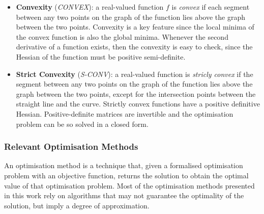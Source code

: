 \documentclass[sn-mathphys-num]{sn-jnl}%
\newcommand \sconv{\textit{S-CONV}}
\newcommand \conv{\textit{CONVEX}}
\renewcommand\vec{\mathbf}
\begin{document}
\begin{itemize}
    To understand the robustness of a model, such as a neural network, some research papers \cite{virmaux2018lipschitz,gouk2021regularisation} have tried to train the underlying model by defining an input-output map 
    with a small Lipschitz constant. The intuition is that if a model is robust, it should not be too affected by perturbations in the input, $f(x + \delta x) \approx f(x) $, and this would be ensured by having $f$ be $\ell$-Lipschitz where $\ell$ is small \cite{adversarial_robustness_lipschitz_bound}.
    \item \textbf{Convexity} (\conv): a real-valued function $f$ is \textit{convex} if each segment between any two points on the graph of the function lies above the graph between the two points.
    Convexity is a key feature since the local minima of the convex function is also the global minima. Whenever the second derivative of a function exists, then the convexity is easy to check, since the Hessian of the function must be positive semi-definite.
    \item \textbf{Strict Convexity} (\sconv): a real-valued function is \textit{stricly convex} if the segment between any two points on the graph of the function lies above the graph between the two points, except for the intersection points between the straight line and the curve. Strictly convex functions have a positive definitive Hessian.
    Positive-definite matrices are invertible and the optimisation problem can be so solved in a closed form.
\end{itemize}

\subsubsection{Relevant Optimisation Methods}
An optimisation method is a technique that, given a formalised optimisation problem with an objective function, returns the solution to obtain the optimal value of that optimisation problem. Most of the optimisation methods presented in this work rely on algorithms that may not guarantee the optimality of the solution, but imply a degree of approximation.
\end{document}

